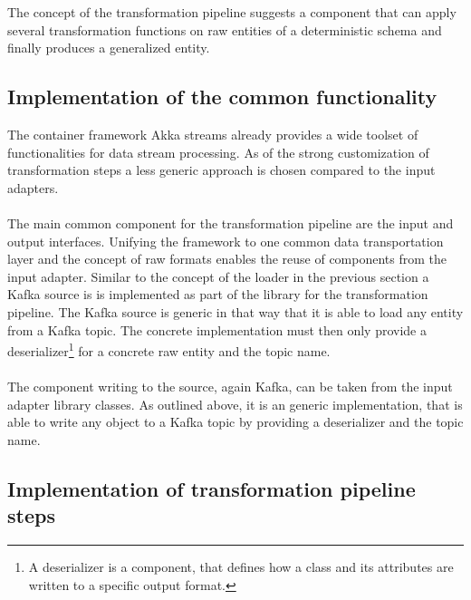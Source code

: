 The concept of the transformation pipeline suggests a component that can apply several transformation functions on raw entities of a deterministic schema and finally produces a generalized entity.

\subsection{Implementation of the common functionality}

The container framework Akka streams already provides a wide toolset of functionalities for data stream processing. As of the strong customization of transformation steps a less generic approach is chosen compared to the input adapters. 
\\\\
The main common component for the transformation pipeline are the input and output interfaces. Unifying the framework to one common data transportation layer and the concept of raw formats enables the reuse of components from the input adapter. Similar to the concept of the loader in the previous section a Kafka source is is implemented as part of the library for the transformation pipeline. The Kafka source is generic in that way that it is able to load any entity from a Kafka topic. The concrete implementation must then only provide a deserializer\footnote{A deserializer is a component, that defines how a class and its attributes are written to a specific output format.} for a concrete raw entity and the topic name.
\\\\
The component writing to the source, again Kafka, can be taken from the input adapter library classes. As outlined above, it is an generic implementation, that is able to write any object to a Kafka topic by providing a deserializer and the topic name.

\subsection{Implementation of transformation pipeline steps}

